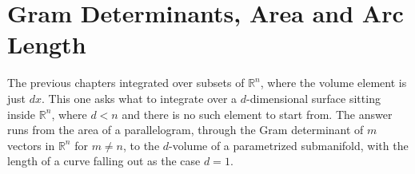 \chapter{Gram Determinants, Area and Arc Length}
\label{ch:gram_determinant}

The previous chapters integrated over subsets of $\mathbb{R}^n$, where the volume element is
just $dx$. This one asks what to integrate over a $d$-dimensional surface sitting inside
$\mathbb{R}^n$, where $d < n$ and there is no such element to start from. The answer runs from
the area of a parallelogram, through the Gram determinant of $m$ vectors in $\mathbb{R}^n$ for
$m \neq n$, to the $d$-volume of a parametrized submanifold, with the length of a curve
falling out as the case $d = 1$.






